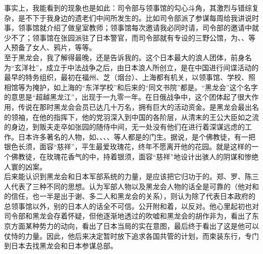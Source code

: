 事实上，我能看到的现象也是如此：司令部与领事馆的勾心斗角，其激烈与错综复杂，是不下于我身边的遗老们中间所发生的。比如司令部派了参谋每周给我讲说时事，领事馆就介绍了做皇室教师；领事馆每次邀请我必同时请，司令部的邀请中就少不了；领事馆在张园派驻了日本警官，而司令部就有专设的三野公馆，为、、等人预备了女人、鸦片，等等。\\

至于黑龙会，我了解得最晚，还是告诉我的。这个日本最大的浪人团体，前身名为“玄洋社”，成立于中法战争之后，由日本浪人所创立，是在中国进行间谍活动的最早的特务组织，最初在福州、芝（烟台）、上海都有机关，以领事馆、学校、照相馆等为掩护，如上海的“东洋学校”和后来的“同文书院”都是。“黑龙会”这个名字的意思是“超越黑龙江”，出现于一九零一年。在日俄战争中，这个团体起了很大作用，传说在那时黑龙会会员已达几十万名，拥有巨大的活动资金。是黑龙会最出名的领袖，在他的指挥下，他的党羽深入到中国的各阶层，从清末的王公大臣如之流的身边，到贩夫走卒如张园的随侍中间，无一处没有他们在进行着深谋远虑的工作。日本许多著名的人物，如、、、、等人都是的门生。据说，是个佛教徒，有一把银色长须，面容“慈祥”，平生最爱玫瑰花，终年不愿离开他的花园。就是这样的一个佛教徒，在玫瑰花香气的中，持着银须，面容“慈祥”地设计出骇人的阴谋和惨绝人寰的凶案。\\

后来能认识到黑龙会和日本军部系统的力量，是应该把它归功于的。郑、罗、陈三人代表了三种不同的思想。认为军部人物以及黑龙会人物的话全是可靠的（他对和的信任，也一半是出于谢、多二人和黑龙会的关系），则认为除了代表日本政府的总领事馆以外，别的日本人的话全不可信。公开附和着，以反对。他心里起初也对司令部和黑龙会存着怀疑，但他逐渐地透过的吹嘘和黑龙会的胡作非为，看出了东京方面某种势力的动向，看出了日本当局的实在意图，最后终于看出了这是他可以仗恃的力量。因此，他后来决定暂时放下追求各国共管的计划，而束装东行，专门到日本去找黑龙会和日本参谋总部。
